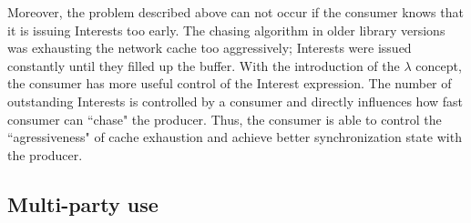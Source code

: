 \documentclass{icn/sig-alternate-2013} %
\begin{document}

Moreover, the problem described above can not occur if the consumer knows that it is issuing Interests too early. The chasing algorithm in older library versions was exhausting the network cache too aggressively; Interests were issued constantly until they filled up the buffer.  With the introduction of the $\lambda$ concept, the consumer has more useful control of the Interest expression. 
The number of outstanding Interests is controlled by a consumer and directly influences how fast consumer can ``chase" the producer. Thus, the consumer is able to control the ``agressiveness" of cache exhaustion and achieve better synchronization state with the producer.






\subsection{Multi-party use}
\end{document}
